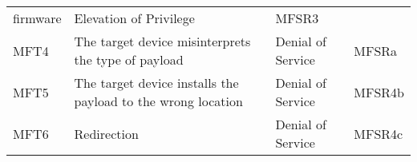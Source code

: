 \documentclass[0-thesis.tex]{subfiles}
\begin{document}
\begin{longtable}[]{@{}llll@{}}
\begin{minipage}[t]{0.44\columnwidth}
    firmware\strut \end{minipage} &
    \begin{minipage}[t]{0.30\columnwidth}\raggedright\strut Elevation of Privilege\strut
    \end{minipage} & \begin{minipage}[t]{0.09\columnwidth}\raggedright\strut MFSR3\strut
    \end{minipage}\tabularnewline
    \begin{minipage}[t]{0.05\columnwidth}\raggedright\strut MFT4\strut \end{minipage} &
    \begin{minipage}[t]{0.44\columnwidth}\raggedright\strut The target device
    misinterprets the type of payload\strut \end{minipage} &
    \begin{minipage}[t]{0.30\columnwidth}\raggedright\strut Denial of Service\strut
    \end{minipage} & \begin{minipage}[t]{0.09\columnwidth}\raggedright\strut MFSRa\strut
    \end{minipage}\tabularnewline
    \begin{minipage}[t]{0.05\columnwidth}\raggedright\strut MFT5\strut \end{minipage} &
    \begin{minipage}[t]{0.44\columnwidth}\raggedright\strut The target device installs the
    payload to the wrong location\strut \end{minipage} &
    \begin{minipage}[t]{0.30\columnwidth}\raggedright\strut Denial of Service\strut
    \end{minipage} & \begin{minipage}[t]{0.09\columnwidth}\raggedright\strut MFSR4b\strut
    \end{minipage}\tabularnewline
    \begin{minipage}[t]{0.05\columnwidth}\raggedright\strut MFT6\strut \end{minipage} &
    \begin{minipage}[t]{0.44\columnwidth}\raggedright\strut Redirection\strut
    \end{minipage} & \begin{minipage}[t]{0.30\columnwidth}\raggedright\strut Denial of
    Service\strut \end{minipage} & \begin{minipage}[t]{0.09\columnwidth}\raggedright\strut
    MFSR4c\strut \end{minipage}\tabularnewline

\end{longtable}
\end{document}
